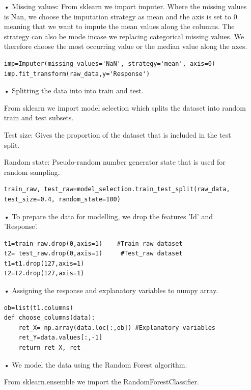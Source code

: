 \begin{enumerate}
\item[•] Missing values: From sklearn we import imputer. Where the missing values is Nan, we choose the imputation strategy as mean and the axis is set to 0 meaning that we want to impute the mean values along the columns. The strategy can also be mode incase we replacing categorical missing values. We therefore choose the most occurring value or the median value along the axes.
\begin{verbatim}
imp=Imputer(missing_values='NaN', strategy='mean', axis=0)
imp.fit_transform(raw_data,y='Response')
\end{verbatim}

\item[•] Splitting the data into into train and test.

From sklearn we import model selection which splits the dataset into random train and test subsets.

Test size: Gives the proportion of the dataset that is included in the test split.

Random state: Pseudo-random number generator state that is used for random sampling. 

\begin{verbatim}
train_raw, test_raw=model_selection.train_test_split(raw_data,
test_size=0.4, random_state=100)
\end{verbatim}

\item[•] To prepare the data for modelling, we drop the features 'Id' and 'Response'.

\begin{verbatim}
t1=train_raw.drop(0,axis=1)    #Train_raw dataset
t2= test_raw.drop(0,axis=1)     #Test_raw dataset
t1=t1.drop(127,axis=1)
t2=t2.drop(127,axis=1)
\end{verbatim}

\item[•] Assigning the response and explanatory variables to numpy array.


\begin{verbatim}
ob=list(t1.columns)
def choose_columns(data):
    ret_X= np.array(data.loc[:,ob]) #Explanatory variables
    ret_Y=data.values[:,-1]
    return ret_X, ret_
\end{verbatim}

\item[•] We model the data using the Random Forest algorithm.

From sklearn.ensemble we import the RandomForestClassifier.


\end{enumerate}
